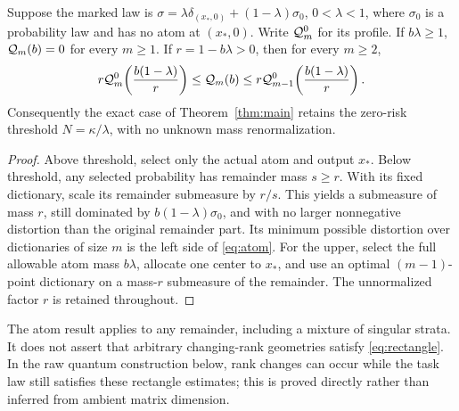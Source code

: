 \begin{proposition}\label{prop:atom}
Suppose the marked law is
$\sigma=\lambda\delta_{(x_*,0)}+(1-\lambda)\sigma_0$, $0<\lambda<1$, where $\sigma_0$ is a probability law and has no atom at $(x_*,0)$. Write $\mathcal Q_m^0$ for its profile. If $b\lambda\ge1$, $\mathcal Q_m(b)=0$ for every $m\ge1$. If $r=1-b\lambda>0$, then for every $m\ge2$,
\begin{equation}\label{eq:atom}
 r\mathcal Q_m^0\!\left(\frac{b(1-\lambda)}r\right)
 \le\mathcal Q_m(b)\le
 r\mathcal Q_{m-1}^0\!\left(\frac{b(1-\lambda)}r\right).
\end{equation}
Consequently the exact case of Theorem~\ref{thm:main} retains the zero-risk threshold $N=\kappa/\lambda$, with no unknown mass renormalization.
\end{proposition}
\begin{proof}
Above threshold, select only the actual atom and output $x_*$. Below threshold, any selected probability has remainder mass $s\ge r$. With its fixed dictionary, scale its remainder submeasure by $r/s$. This yields a submeasure of mass $r$, still dominated by $b(1-\lambda)\sigma_0$, and with no larger nonnegative distortion than the original remainder part. Its minimum possible distortion over dictionaries of size $m$ is the left side of \eqref{eq:atom}. For the upper, select the full allowable atom mass $b\lambda$, allocate one center to $x_*$, and use an optimal $(m-1)$-point dictionary on a mass-$r$ submeasure of the remainder. The unnormalized factor $r$ is retained throughout.
\end{proof}

The atom result applies to any remainder, including a mixture of singular strata. It does not assert that arbitrary changing-rank geometries satisfy \eqref{eq:rectangle}. In the raw quantum construction below, rank changes can occur while the task law still satisfies these rectangle estimates; this is proved directly rather than inferred from ambient matrix dimension.
